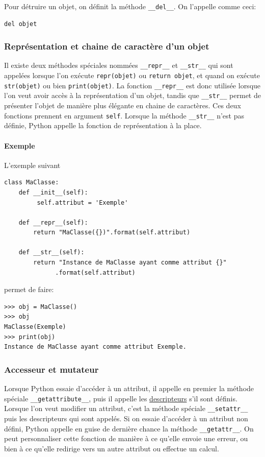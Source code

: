 \documentclass[a4paper, french, 10pt]{article}
\newcommand{\code}[1]{{\small\texttt{#1}}}
\begin{document}
Pour détruire un objet, on définit la méthode \code{\_\_del\_\_}. On l'appelle comme ceci:
\begin{verbatim}
del objet
\end{verbatim}

\subsubsection{Représentation et chaine de caractère d'un objet}
Il existe deux méthodes spéciales nommées \code{\_\_repr\_\_} et \code{\_\_str\_\_} qui sont appelées lorsque l'on exécute \code{repr(objet)} ou \code{return objet}, et quand on exécute \code{str(objet)} ou bien \code{print(objet)}. La fonction \code{\_\_repr\_\_} est donc utilisée lorsque l'on veut avoir accès à la représentation d'un objet, tandis que \code{\_\_str\_\_} permet de présenter l'objet de manière plus élégante en chaine de caractères. Ces deux fonctions prennent en argument \code{self}. Lorsque la méthode \code{\_\_str\_\_} n'est pas définie, Python appelle la fonction de représentation à la place.

\paragraph{Exemple} L'exemple suivant
\begin{verbatim}
class MaClasse:
    def __init__(self):
         self.attribut = 'Exemple'

    def __repr__(self):
        return "MaClasse({})".format(self.attribut)

    def __str__(self):
        return "Instance de MaClasse ayant comme attribut {}"
              .format(self.attribut)
\end{verbatim}
permet de faire:
\begin{Verbatim}[fontsize = \footnotesize, frame = single]
>>> obj = MaClasse()
>>> obj
MaClasse(Exemple)
>>> print(obj)
Instance de MaClasse ayant comme attribut Exemple.
\end{Verbatim}

\subsubsection{Accesseur et mutateur}
Lorsque Python essaie d'accéder à un attribut, il appelle en premier la méthode spéciale \code{\_\_getattribute\_\_}, puis il appelle les \hyperref[sec:proprietes]{descripteurs} s'il sont définis. Lorsque l'on veut modifier un attribut, c'est la méthode spéciale \code{\_\_setattr\_\_} puis les descripteurs qui sont appelés. Si on essaie d'accéder à un attribut non défini, Python appelle en guise de dernière chance la méthode \code{\_\_getattr\_\_}. On peut personnaliser cette fonction de manière à ce qu'elle envoie une erreur, ou bien à ce qu'elle redirige vers un autre attribut ou effectue un calcul.
\end{document}
